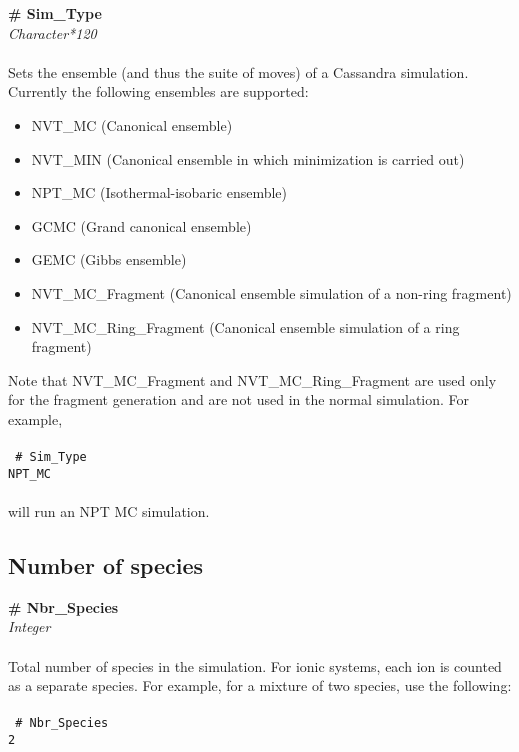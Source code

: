 {\bf \# Sim\_Type} \\
{\it Character*120} \\ \\
%
Sets the ensemble (and thus the suite of moves) of a Cassandra simulation. Currently the following ensembles are supported: \\
\begin{itemize}
\item NVT\_MC (Canonical ensemble)
\item NVT\_MIN (Canonical ensemble in which minimization is carried out)
\item NPT\_MC (Isothermal-isobaric ensemble)
\item GCMC    (Grand canonical ensemble)
\item GEMC (Gibbs ensemble)
\item NVT\_MC\_Fragment (Canonical ensemble simulation of a non-ring fragment)
\item NVT\_MC\_Ring\_Fragment (Canonical ensemble simulation of a ring fragment)
\end{itemize} 
Note that NVT\_MC\_Fragment and  NVT\_MC\_Ring\_Fragment are used only
for the fragment generation and are not used in the normal
simulation. For example, \\ \\
\texttt{
\# Sim\_Type \\
NPT\_MC \\ \\
}
%
will run an NPT MC simulation.
%
%
%
\subsection{Number of species}\label{sec:Nbr_Species} 
{\bf \# Nbr\_Species} \\
{\it Integer} \\ \\
%
Total number of species in the simulation. For ionic systems, each ion
is counted as a separate species. For example, for a mixture of two
species, use the following: \\  \\
%
\texttt{
\# Nbr\_Species \\
2 
}
%
%
%
